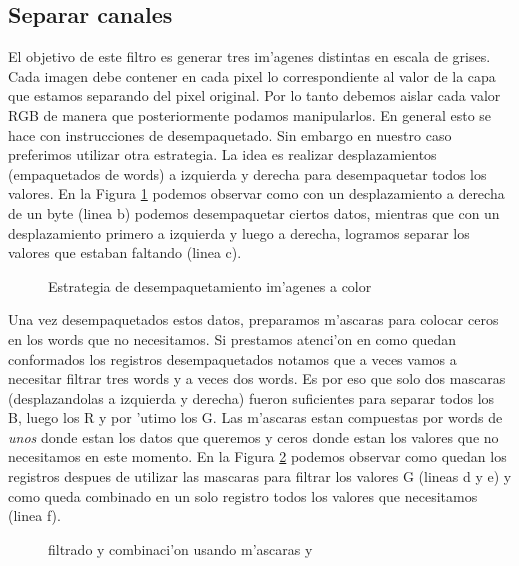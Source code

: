 \subsection{Separar canales}
El objetivo de este filtro es generar tres im'agenes distintas en escala de grises. Cada imagen debe contener en cada pixel lo correspondiente al valor de la capa que estamos separando del pixel original. Por lo tanto debemos aislar cada valor RGB de manera que posteriormente podamos manipularlos. En general esto se hace con instrucciones de desempaquetado. Sin embargo en nuestro caso preferimos utilizar otra estrategia. La idea es realizar desplazamientos (empaquetados de words) a izquierda y derecha para desempaquetar todos los valores. En la Figura \ref{est:separar-1} podemos observar como con un desplazamiento a derecha de un byte (linea b) podemos desempaquetar ciertos datos, mientras que con un desplazamiento primero a izquierda y luego a derecha, logramos separar los valores que estaban faltando (linea c).

\begin{figure}[ht]
\caption{Estrategia de desempaquetamiento im'agenes a color}
\label{est:separar-1}
\end{figure}

Una vez desempaquetados estos datos, preparamos m'ascaras para colocar ceros en los words que no necesitamos. Si prestamos atenci'on en como quedan conformados los registros desempaquetados notamos que a veces vamos a necesitar filtrar tres words y a veces dos words. Es por eso que solo dos mascaras (desplazandolas a izquierda y derecha) fueron suficientes para separar todos los B, luego los R y por 'utimo los G. Las m'ascaras estan compuestas por words de \textit{unos} donde estan los datos que queremos y ceros donde estan los valores que no necesitamos en este momento. En la Figura \ref{est:separar-2} podemos observar como quedan los registros despues de utilizar las mascaras para filtrar los valores G (lineas d y e) y como queda combinado en un solo registro todos los valores que necesitamos (linea f).

\begin{figure}[ht]
\caption{filtrado y combinaci'on usando m'ascaras  y }
\label{est:separar-2}
\end{figure}

